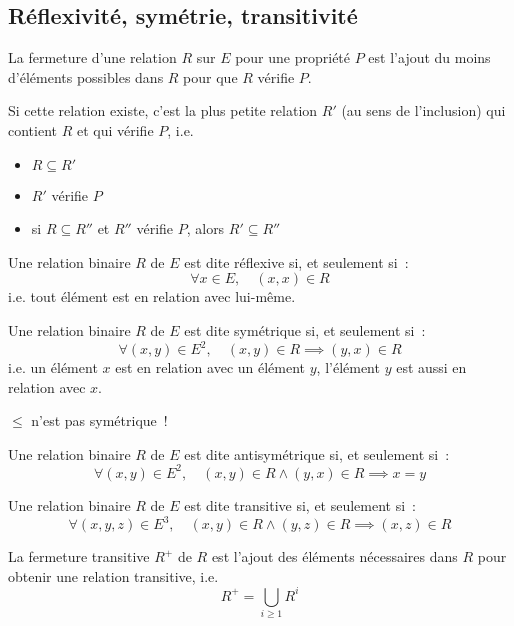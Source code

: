 \documentclass[a4paper, titlepage]{article}
\begin{document}
    \subsection{Réflexivité, symétrie, transitivité}
    \begin{defn}
        La fermeture d'une relation $R$ sur $E$ pour une propriété $P$ est l'ajout du moins d'éléments possibles dans
        $R$ pour que $R$ vérifie $P$.

        Si cette relation existe, c'est la plus petite relation $R'$ (au sens de l'inclusion) qui contient $R$ et qui
        vérifie $P$, i.e.
        \begin{itemize}
            \item $R\subseteq R'$
            \item $R'$ vérifie $P$
            \item si $R\subseteq R''$ et $R''$ vérifie $P$, alors $R'\subseteq R''$
        \end{itemize}
    \end{defn}
    \begin{defn}
        Une relation binaire $R$ de $E$ est dite réflexive si, et seulement si~:
        $$ \forall x\in E,\quad (x,x)\in R$$
        i.e. tout élément est en relation avec lui-même.
    \end{defn}
    \begin{defn}
        Une relation binaire $R$ de $E$ est dite symétrique si, et seulement si~:
        $$ \forall (x,y)\in E^2,\quad (x,y)\in R\implies (y,x)\in R $$
        i.e. un élément $x$ est en relation avec un élément $y$, l’élément $y$ est aussi en relation avec $x$.
    \end{defn}
    \begin{warn}
        $\leqslant$ n'est pas symétrique~!
    \end{warn}
    \begin{defn}
        Une relation binaire $R$ de $E$ est dite antisymétrique si, et seulement si~:
        $$ \forall (x,y)\in E^2,\quad (x,y)\in R\land (y,x)\in R \implies x=y$$
    \end{defn}
    \begin{defn}
        Une relation binaire $R$ de $E$ est dite transitive si, et seulement si~:
        $$ \forall (x,y,z)\in E^3,\quad (x,y)\in R\land(y,z)\in R\implies(x,z)\in R $$
    \end{defn}
    \begin{defn}
        La fermeture transitive $R^+$ de $R$ est l'ajout des éléments nécessaires dans $R$ pour obtenir une relation
        transitive, i.e.
        $$ R^+ = \bigcup_{i\geqslant 1} R^i $$
    \end{defn}
\end{document}
